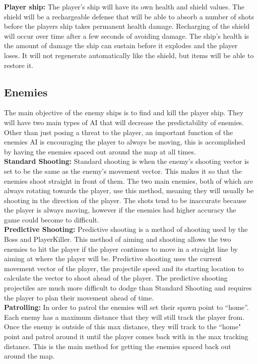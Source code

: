 \documentclass[12pt]{article}       %
\def\hs{\hspace{15pt}}
\begin{document}
	{\bf Player ship:} The player's ship will have its own health and shield values. The shield will be a rechargeable defense that will be able to absorb a number of shots before the players ship takes permanent health damage. Recharging of the shield will occur over time after a few seconds of avoiding damage. The ship's health is the amount of damage the ship can sustain before it explodes and the player loses. It will not regenerate automatically like the shield, but items will be able to restore it. 

\subsection{Enemies} %

\hs The main objective of the enemy ships is to find and kill the player ship. They will have two main types of AI that will decrease the predictability of enemies. Other than just posing a threat to the player, an important function of the enemies AI is encouraging the player to always be moving, this is accomplished by having the enemies spaced out around the map at all times. \\

	{\bf Standard Shooting:} Standard shooting is when the enemy’s shooting vector is set to be the same as the enemy’s movement vector. This makes it so that the enemies shoot straight in front of them. The two main enemies, both of which are always rotating towards the player, use this method, meaning they will usually be shooting in the direction of the player.  The shots tend to be inaccurate because the player is always moving, however if the enemies had higher accuracy the game could become to difficult. \\

	{\bf Predictive Shooting:} Predictive shooting is a method of shooting used by the Boss and PlayerKiller. This method of aiming and shooting allows the two enemies to hit the player if the player continues to move in a straight line by aiming at where the player will be. Predictive shooting uses the current movement vector of the player, the projectile speed and its starting location to calculate the vector to shoot ahead of the player. The predictive shooting projectiles are much more difficult to dodge than Standard Shooting and requires the player to plan their movement ahead of time. \\

	{\bf Patrolling:} In order to patrol the enemies will set their spawn point to ``home''. Each enemy has a maximum distance that they will still track the player from. Once the enemy is outside of this max distance, they will track to the ``home" point and patrol around it until the player comes back with in the max tracking distance. This is the main method for getting the enemies spaced back out around the map. \\
\end{document}
